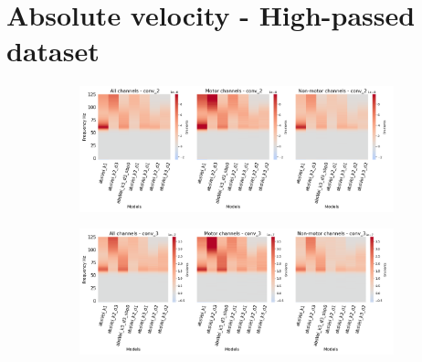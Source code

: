 \clearpage
\section*{Absolute velocity - High-passed dataset}\label{subsec:absVel-high-passed-dataset-appendixD}
\begin{figure}[!htpb]
\centering
\begin{subfigure}[b]{\textwidth}
   \includegraphics[width=1\linewidth]{img/appendix/D/conv-2/hp-m/absVel_model_gradients_all_kinds}
   \caption{}
   \label{fig:absVel-pw-hp-grads-conv-2}
\end{subfigure}

\begin{subfigure}[b]{\textwidth}
   \includegraphics[width=1\linewidth]{img/appendix/D/conv-3/hp-m/absVel_model_gradients_all_kinds}
   \caption{}
   \label{fig:absVel-pw-hp-grads-conv-3}
\end{subfigure}
\end{figure}
\clearpage   

